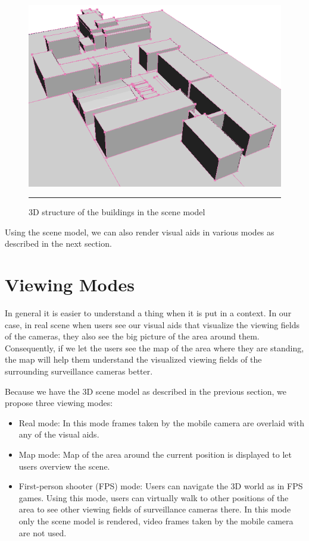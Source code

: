 \begin{figure}[htbp]
	\centering
	\includegraphics[width=14cm]{./Primitives/scene_model.png}
	\rule{35em}{0.5pt}
	\caption[Scene model]{3D structure of the buildings in the scene model}
	\label{fig:SceneModel}
\end{figure}

Using the scene model, we can also render visual aids in various modes as described in the next section.


\section{Viewing Modes}
\label{ViewingModes}

In general it is easier to understand a thing when it is put in a context. In our case, in real scene when users see our visual aids that visualize the viewing fields of the cameras, they also see the big picture of the area around them. Consequently, if we let the users see the map of the area where they are standing, the map will help them understand the visualized viewing fields of the surrounding surveillance cameras better.

Because we have the 3D scene model as described in the previous section, we propose three viewing modes:

\begin{itemize}
	\item Real mode: In this mode frames taken by the mobile camera are overlaid with any of the visual aids.
	\item Map mode: Map of the area around the current position is displayed to let users overview the scene.
	\item First-person shooter (FPS) mode: Users can navigate the 3D world as in FPS games. Using this mode, users can virtually walk to other positions of the area to see other viewing fields of surveillance cameras there. In this mode only the scene model is rendered, video frames taken by the mobile camera are not used.
\end{itemize}

